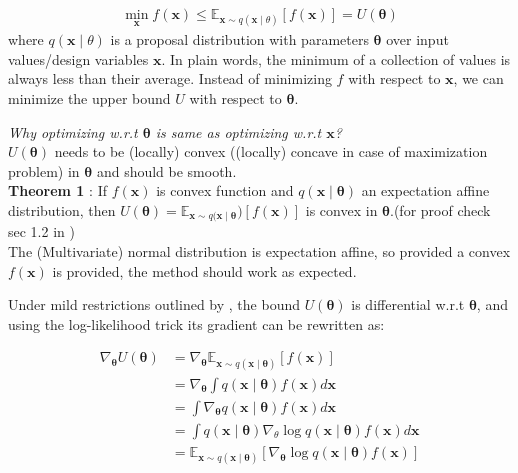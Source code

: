 \begin{align}\label{eq:VO_main}
	\min _{\boldsymbol{x}} f(\boldsymbol{x}) \leq \mathbb{E}_{\boldsymbol{x} \sim q(\boldsymbol{x} \mid \theta)}[f(\boldsymbol{x})]=U(\boldsymbol{\theta})
\end{align}
where $q(\boldsymbol{x} \mid \theta)$ is a proposal distribution with parameters $\bm{\theta}$ over input values/design variables $\bm{x}$. In plain words, the minimum of a collection of values is always less than their average. Instead of minimizing $f$ with respect to $\bm{x}$, we can minimize the upper bound $U$ with respect to $\bm{\theta}$.

\begin{mdframed}[backgroundcolor=lightgray, linewidth =0pt]
	\emph{Why optimizing w.r.t $\bm{\theta}$ is same as optimizing w.r.t $\bm{x}$?}\\
	$U(\bm{\theta})$ needs to be (locally) convex ((locally) concave in case of maximization problem) in $\bm{\theta}$ and should be smooth.\\
	\textbf{Theorem 1} : If $f(\boldsymbol{x})$ is convex function and $q(\boldsymbol{x} \mid \bm{\theta})$ an expectation affine distribution, then $U(\bm{\theta}) = \mathbb{E}_{\boldsymbol{x} \sim q(\boldsymbol{x} \mid \bm{\theta}})[f(\boldsymbol{x})]$ is convex in $\bm{\theta}$.(for proof check sec 1.2 in \cite{staines_variational_2012})\\
	The (Multivariate) normal distribution is expectation affine, so provided a convex $f(\boldsymbol{x})$ is provided, the method should work as expected.
	
\end{mdframed}

Under mild restrictions outlined by \cite{staines_variational_2012}, the bound $U(\boldsymbol{ \theta})$ is differential w.r.t $\bm{\theta}$, and using the log-likelihood trick its gradient can be rewritten as:

\begin{align}\label{eq:grad_estimator}
	\nabla_{\boldsymbol{\theta}} U(\boldsymbol{\theta}) &=\nabla_{\boldsymbol{\theta}} \mathbb{E}_{\boldsymbol{x} \sim q(\boldsymbol{x} \mid \boldsymbol{\theta})}[f(\boldsymbol{x})] \nonumber \\
	&=\nabla_{\boldsymbol{\theta}} \int q(\boldsymbol{x} \mid \boldsymbol{\theta}) f(\boldsymbol{x}) d \boldsymbol{x} 
	\nonumber\\
	&=\int \nabla_{\boldsymbol{\theta}} q(\boldsymbol{x} \mid \boldsymbol{\theta}) f(\boldsymbol{x}) d \boldsymbol{x} 
	\nonumber \\
	&=\int q(\boldsymbol{x} \mid \boldsymbol{\theta}) \nabla_\theta \log q(\boldsymbol{x} \mid \boldsymbol{\theta}) f(\boldsymbol{x}) d \boldsymbol{x} 
	\nonumber \\
	&=\mathbb{E}_{\boldsymbol{x} \sim q(\boldsymbol{x} \mid \boldsymbol{\theta})}\left[\nabla_{\boldsymbol{\theta}} \log q(\boldsymbol{x} \mid \boldsymbol{\theta}) f(\boldsymbol{x})\right]
\end{align}

